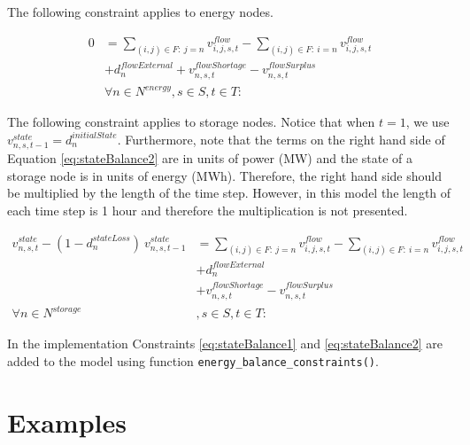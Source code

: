 \documentclass{article}
\begin{document}
\noindent The following constraint applies to energy nodes.

\begin{align}
    0 &=  \sum_{(i,j) \in F: \ j = n} v^{flow}_{i,j, s, t} - \sum_{(i,j) \in F: \ i = n} v^{flow}_{i,j, s, t} \nonumber \\[0.5cm]
    & + d^{flowExternal}_{n} + v^{flowShortage}_{n, s, t} - v^{flowSurplus}_{n, s, t} 
    \label{eq:stateBalance1} \\[0.5cm]
    & \forall n \in N^{energy}, s \in S, t\in T: \nonumber
\end{align}

The following constraint applies to storage nodes. Notice that when $t=1$, we use $v^{state}_{n, s, t-1} = d^{initialState}_n$. Furthermore, note that the terms on the right hand side of Equation \eqref{eq:stateBalance2} are in units of power (MW) and the state of a storage node is in units of energy (MWh). Therefore, the right hand side should be multiplied by the length of the time step. However, in this model the length of each time step is 1 hour and therefore the multiplication is not presented. 

\begin{align}
     v^{state}_{n, s, t} - (1-d^{stateLoss}_{n}) \ v^{state}_{n, s, t-1} &=  \sum_{(i,j) \in F: \ j = n} v^{flow}_{i,j, s, t} - \sum_{(i,j) \in F: \ i = n} v^{flow}_{i,j, s, t} \nonumber \\[0.5cm]
    & + d^{flowExternal}_{n}\nonumber  \\[0.5cm]
    &+ v^{flowShortage}_{n, s, t} - v^{flowSurplus}_{n, s, t} 
    \label{eq:stateBalance2} \\[0.5cm]
    \forall n \in N^{storage} &, s \in S, t\in T: \nonumber
\end{align}

In the implementation Constraints \eqref{eq:stateBalance1} and \eqref{eq:stateBalance2} are added to the model using function \texttt{energy\_balance\_constraints()}.





\section{Examples}
\end{document}
